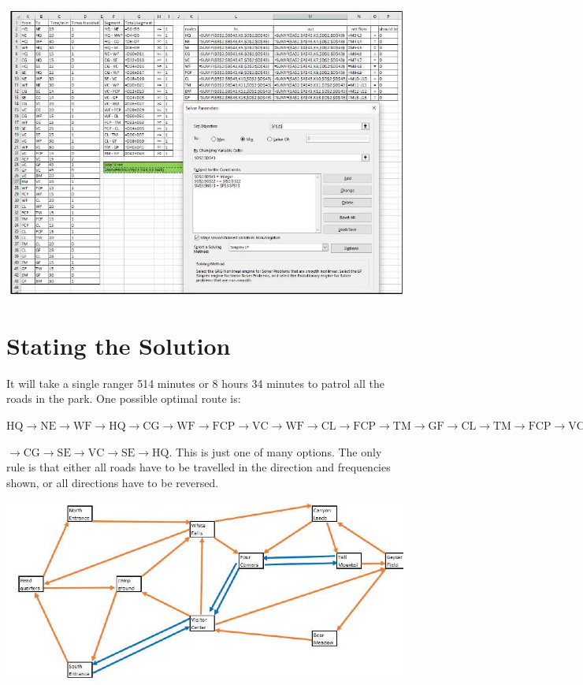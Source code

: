 \documentclass[10pt]{article}
\begin{document}
\includegraphics[max width=\textwidth]{2022_07_05_5945264bba2a5f6ba667g-59(1)}

\section{Stating the Solution}
It will take a single ranger 514 minutes or 8 hours 34 minutes to patrol all the roads in the park. One possible optimal route is:

$\mathrm{HQ} \rightarrow \mathrm{NE} \rightarrow \mathrm{WF} \rightarrow \mathrm{HQ} \rightarrow \mathrm{CG} \rightarrow \mathrm{WF} \rightarrow \mathrm{FCP} \rightarrow \mathrm{VC} \rightarrow \mathrm{WF} \rightarrow \mathrm{CL} \rightarrow \mathrm{FCP} \rightarrow \mathrm{TM} \rightarrow \mathrm{GF} \rightarrow \mathrm{CL} \rightarrow \mathrm{TM} \rightarrow \mathrm{FCP} \rightarrow \mathrm{VC} \rightarrow \mathrm{GF} \rightarrow \mathrm{BM} \rightarrow \mathrm{VC}$

$\rightarrow \mathrm{CG} \rightarrow \mathrm{SE} \rightarrow \mathrm{VC} \rightarrow \mathrm{SE} \rightarrow \mathrm{HQ}$. This is just one of many options. The only rule is that either all roads have to be travelled in the direction and frequencies shown, or all directions have to be reversed.

\includegraphics[max width=\textwidth]{2022_07_05_5945264bba2a5f6ba667g-60}
\end{document}
